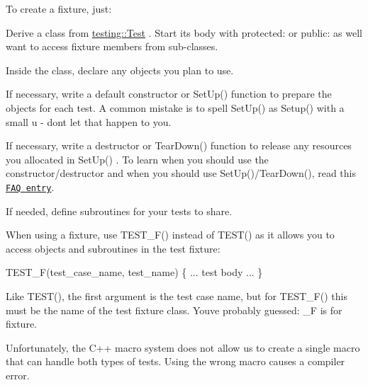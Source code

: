 To create a fixture, just\+:
\begin{DoxyEnumerate}
\item Derive a class from {\ttfamily \mbox{\hyperlink{classtesting_1_1_test}{testing\+::\+Test}}} . Start its body with {\ttfamily protected\+:} or {\ttfamily public\+:} as we\textquotesingle{}ll want to access fixture members from sub-\/classes.
\end{DoxyEnumerate}
\begin{DoxyEnumerate}
\item Inside the class, declare any objects you plan to use.
\end{DoxyEnumerate}
\begin{DoxyEnumerate}
\item If necessary, write a default constructor or {\ttfamily Set\+Up()} function to prepare the objects for each test. A common mistake is to spell {\ttfamily Set\+Up()} as {\ttfamily Setup()} with a small {\ttfamily u} -\/ don\textquotesingle{}t let that happen to you.
\end{DoxyEnumerate}
\begin{DoxyEnumerate}
\item If necessary, write a destructor or {\ttfamily Tear\+Down()} function to release any resources you allocated in {\ttfamily Set\+Up()} . To learn when you should use the constructor/destructor and when you should use {\ttfamily Set\+Up()/\+Tear\+Down()}, read this \href{V1_6_FAQ.md#should-i-use-the-constructordestructor-of-the-test-fixture-or-the-set-uptear-down-function}{\tt F\+AQ entry}.
\end{DoxyEnumerate}
\begin{DoxyEnumerate}
\item If needed, define subroutines for your tests to share.
\end{DoxyEnumerate}

When using a fixture, use {\ttfamily T\+E\+S\+T\+\_\+\+F()} instead of {\ttfamily T\+E\+S\+T()} as it allows you to access objects and subroutines in the test fixture\+: 
\begin{DoxyCode}
TEST\_F(test\_case\_name, test\_name) \{
 ... test body ...
\}
\end{DoxyCode}


Like {\ttfamily T\+E\+S\+T()}, the first argument is the test case name, but for {\ttfamily T\+E\+S\+T\+\_\+\+F()} this must be the name of the test fixture class. You\textquotesingle{}ve probably guessed\+: {\ttfamily \+\_\+F} is for fixture.

Unfortunately, the C++ macro system does not allow us to create a single macro that can handle both types of tests. Using the wrong macro causes a compiler error.

